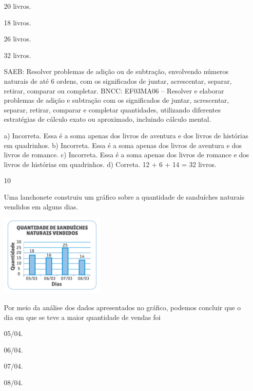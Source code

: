 {\begin{escolha}
{\begin{escolha}
\item
  20 livros.
\item
  18 livros.
\item
  26 livros.
\item
  32 livros.
\end{escolha}

SAEB: Resolver problemas de adição ou de subtração,
envolvendo números naturais de até 6 ordens, com os significados de juntar, acrescentar, separar, retirar, comparar ou completar.
BNCC: EF03MA06 – Resolver e elaborar problemas de adição e subtração com os significados de
juntar, acrescentar, separar, retirar, comparar e completar quantidades, utilizando diferentes
estratégias de cálculo exato ou aproximado, incluindo cálculo mental.

a) Incorreta. Essa é a soma apenas dos livros de aventura e dos livros de histórias em quadrinhos.
b) Incorreta. Essa é a soma apenas dos livros de aventura e dos livros de romance.
c) Incorreta. Essa é a soma apenas dos livros de romance e dos livros de histórias em quadrinhos.
d) Correta. 12 + 6 + 14 = 32 livros.

\num{10}

Uma lanchonete construiu um gráfico sobre a quantidade de sanduíches
naturais vendidos em alguns dias.

\includegraphics[width=2.05128in,height=1.61850in]{media/image124.png}


Por meio da análise dos dados apresentados no gráfico, podemos concluir que o dia em que se teve a maior quantidade de vendas foi

\begin{escolha}

\item
  05/04.
\item
  06/04.
\item
  07/04.
\item
  08/04.
\end{escolha}

}
\end{escolha}}
